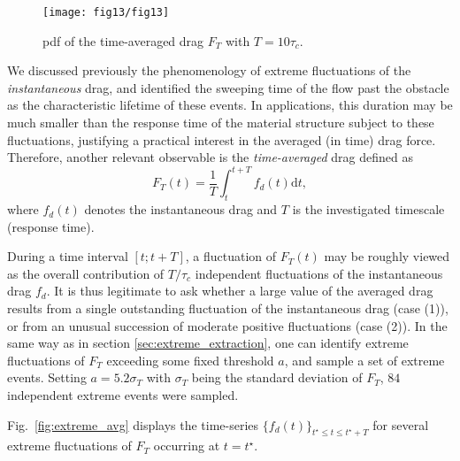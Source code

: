 \begin{figure}
	\centering
	\texttt{[image: fig13/fig13]}
	\caption{\ac{pdf} of the time-averaged drag $F_T$ with $T = 10\tau_c$. }
	\label{fig:PDF_AVG}
\end{figure}

We discussed previously the phenomenology of extreme fluctuations of the \emph{instantaneous} drag, and identified the sweeping time of the flow past the obstacle as the characteristic lifetime of these events. 
%
In applications, this duration may be much smaller than the response time of the material structure subject to these fluctuations, justifying a practical interest in the averaged (in time) drag force. 
%
%
Therefore, another relevant observable is the \textit{time-averaged} drag defined as
\begin{equation}
\label{eq:def_time_averaged_drag}
F_T(t) = \frac{1}{T}\int_t^{t+T} f_d(t) \mathrm{d}t,
\end{equation}
where $f_d(t)$ denotes the instantaneous drag and $T$ is the investigated timescale (response time).

%
During a time interval $[t;t+T]$, a fluctuation of $F_T(t)$ may be roughly viewed as the overall contribution of  $T / \tau_c$ independent fluctuations of the {instantaneous} drag $f_d$.  
%
It is thus legitimate to ask whether a large value of the averaged drag results from a single outstanding fluctuation of the instantaneous drag (case (1)),  or from  an unusual succession of moderate positive fluctuations (case (2)). 
%
%
In the same way as in section \ref{sec:extreme_extraction}, one can identify extreme fluctuations of $F_T$ exceeding some fixed threshold $a$, and sample a set of extreme events.
Setting $a=5.2\sigma_T$ with $\sigma_T$ being the standard deviation of $F_T$, $84$ independent extreme events were sampled. 


%
Fig.~\ref{fig:extreme_avg} displays the time-series $\{f_d(t)\}_{t^{\star} \leq t \leq t^{\star}+T}$ for several extreme fluctuations of $F_T$ occurring at $t=t^\star$.
